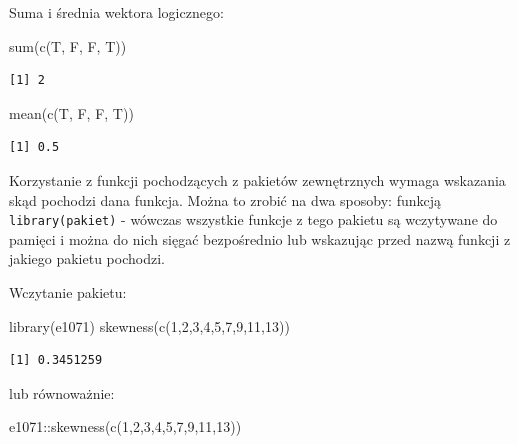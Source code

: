 \documentclass[
  letterpaper,
  DIV=11,
  numbers=noendperiod]{scrreprt}
\newenvironment{Shaded}{\begin{snugshade}}{\end{snugshade}}
\newcommand{\DecValTok}[1]{\textcolor[rgb]{0.68,0.00,0.00}{#1}}
\newcommand{\FunctionTok}[1]{\textcolor[rgb]{0.28,0.35,0.67}{#1}}
\newcommand{\NormalTok}[1]{\textcolor[rgb]{0.00,0.23,0.31}{#1}}
\newcommand{\SpecialCharTok}[1]{\textcolor[rgb]{0.37,0.37,0.37}{#1}}
\begin{document}
Suma i średnia wektora logicznego:

\begin{Shaded}
\begin{Highlighting}[]
\FunctionTok{sum}\NormalTok{(}\FunctionTok{c}\NormalTok{(T, F, F, T))}
\end{Highlighting}
\end{Shaded}

\begin{verbatim}
[1] 2
\end{verbatim}

\begin{Shaded}
\begin{Highlighting}[]
\FunctionTok{mean}\NormalTok{(}\FunctionTok{c}\NormalTok{(T, F, F, T))}
\end{Highlighting}
\end{Shaded}

\begin{verbatim}
[1] 0.5
\end{verbatim}

Korzystanie z funkcji pochodzących z pakietów zewnętrznych wymaga
wskazania skąd pochodzi dana funkcja. Można to zrobić na dwa sposoby:
funkcją \texttt{library(pakiet)} - wówczas wszystkie funkcje z tego
pakietu są wczytywane do pamięci i można do nich sięgać bezpośrednio lub
wskazując przed nazwą funkcji z jakiego pakietu pochodzi.

Wczytanie pakietu:

\begin{Shaded}
\begin{Highlighting}[]
\FunctionTok{library}\NormalTok{(e1071)}
\FunctionTok{skewness}\NormalTok{(}\FunctionTok{c}\NormalTok{(}\DecValTok{1}\NormalTok{,}\DecValTok{2}\NormalTok{,}\DecValTok{3}\NormalTok{,}\DecValTok{4}\NormalTok{,}\DecValTok{5}\NormalTok{,}\DecValTok{7}\NormalTok{,}\DecValTok{9}\NormalTok{,}\DecValTok{11}\NormalTok{,}\DecValTok{13}\NormalTok{))}
\end{Highlighting}
\end{Shaded}

\begin{verbatim}
[1] 0.3451259
\end{verbatim}

lub równoważnie:

\begin{Shaded}
\begin{Highlighting}[]
\NormalTok{e1071}\SpecialCharTok{::}\FunctionTok{skewness}\NormalTok{(}\FunctionTok{c}\NormalTok{(}\DecValTok{1}\NormalTok{,}\DecValTok{2}\NormalTok{,}\DecValTok{3}\NormalTok{,}\DecValTok{4}\NormalTok{,}\DecValTok{5}\NormalTok{,}\DecValTok{7}\NormalTok{,}\DecValTok{9}\NormalTok{,}\DecValTok{11}\NormalTok{,}\DecValTok{13}\NormalTok{))}
\end{Highlighting}
\end{Shaded}
\end{document}

